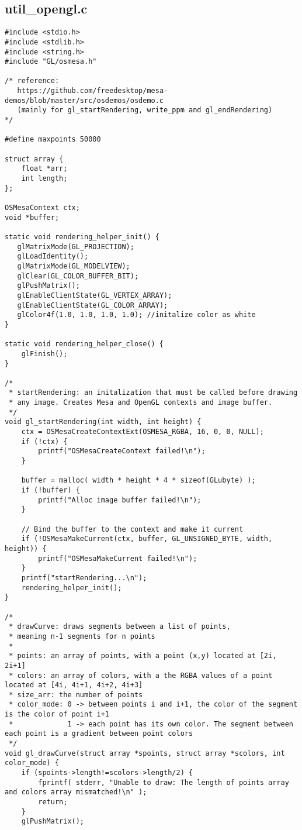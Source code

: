 \documentclass[main.tex]{subfiles}
\begin{document}
\subsection{util\_opengl.c}
\begin{lstlisting}
#include <stdio.h>
#include <stdlib.h>
#include <string.h>
#include "GL/osmesa.h"

/* reference: 
   https://github.com/freedesktop/mesa-demos/blob/master/src/osdemos/osdemo.c
   (mainly for gl_startRendering, write_ppm and gl_endRendering)
*/

#define maxpoints 50000

struct array {
    float *arr;
    int length;
};

OSMesaContext ctx;
void *buffer;

static void rendering_helper_init() {
   glMatrixMode(GL_PROJECTION);
   glLoadIdentity();
   glMatrixMode(GL_MODELVIEW);
   glClear(GL_COLOR_BUFFER_BIT);
   glPushMatrix();
   glEnableClientState(GL_VERTEX_ARRAY);
   glEnableClientState(GL_COLOR_ARRAY);
   glColor4f(1.0, 1.0, 1.0, 1.0); //initalize color as white
}

static void rendering_helper_close() {
    glFinish();
}

/*
 * startRendering: an initalization that must be called before drawing
 * any image. Creates Mesa and OpenGL contexts and image buffer.
 */
void gl_startRendering(int width, int height) {
    ctx = OSMesaCreateContextExt(OSMESA_RGBA, 16, 0, 0, NULL);
    if (!ctx) {
        printf("OSMesaCreateContext failed!\n");
    }

    buffer = malloc( width * height * 4 * sizeof(GLubyte) );
    if (!buffer) {
        printf("Alloc image buffer failed!\n");
    }

    // Bind the buffer to the context and make it current
    if (!OSMesaMakeCurrent(ctx, buffer, GL_UNSIGNED_BYTE, width, height)) {
        printf("OSMesaMakeCurrent failed!\n");
    }
    printf("startRendering...\n");
    rendering_helper_init();
}

/*
 * drawCurve: draws segments between a list of points,
 * meaning n-1 segments for n points
 *
 * points: an array of points, with a point (x,y) located at [2i, 2i+1]
 * colors: an array of colors, with a the RGBA values of a point located at [4i, 4i+1, 4i+2, 4i+3]
 * size_arr: the number of points
 * color_mode: 0 -> between points i and i+1, the color of the segment is the color of point i+1
 *             1 -> each point has its own color. The segment between each point is a gradient between point colors
 */
void gl_drawCurve(struct array *spoints, struct array *scolors, int color_mode) {
    if (spoints->length!=scolors->length/2) {
        fprintf( stderr, "Unable to draw: The length of points array and colors array mismatched!\n" );
        return;
    }
    glPushMatrix();
    

\end{lstlisting}
\end{document}
